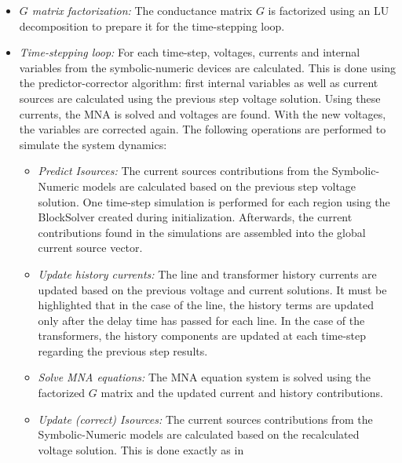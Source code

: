 \begin{itemize}
    with Symbolic-Numeric models connected to it. Then, a BlockSolver is created for each region, which will be used to solve the local equations of the region during the time-stepping loop. In this way, the size of each system block to be solved is reduced and the calculation 
    could be parallelized in future implementations to improve calculation time. A new class called "EMTSolverProperties" is created to store the Blocksolver, parameters, initial guesses and solutions of each region.
    \item \textit{$G$ matrix factorization:} The conductance matrix $G$ is factorized using an LU decomposition to prepare it for the time-stepping loop. 
    \item \textit{Time-stepping loop:} For each time-step, voltages, currents and internal variables from the symbolic-numeric devices are calculated. This is done using the predictor-corrector algorithm: first
    internal variables as well as current sources are calculated using the previous step voltage solution. Using these currents, the MNA is solved and voltages are found. With the new voltages, the variables are corrected again. The following operations are performed to simulate the system dynamics:
        \begin{itemize}
            \item \textit{Predict Isources:} The current sources contributions from the Symbolic-Numeric models are calculated based on the previous step voltage solution. One time-step simulation is performed for each region using the BlockSolver created during initialization. Afterwards,
            the current contributions found in the simulations are assembled into the global current source vector.
            \item \textit{Update history currents:} The line and transformer history currents are updated based on the previous voltage and current solutions. It must be highlighted that in the case of the line,
            the history terms are updated only after the delay time has passed for each line. In the case of the transformers, the history components are updated at each time-step regarding the previous step results.
            \item \textit{Solve MNA equations:} The MNA equation system is solved using the factorized $G$ matrix and the updated current and history contributions. 
            \item \textit{Update (correct) Isources:} The current sources contributions from the Symbolic-Numeric models are calculated based on the recalculated voltage solution. This is done exactly as in 

\end{itemize}
\end{itemize}
